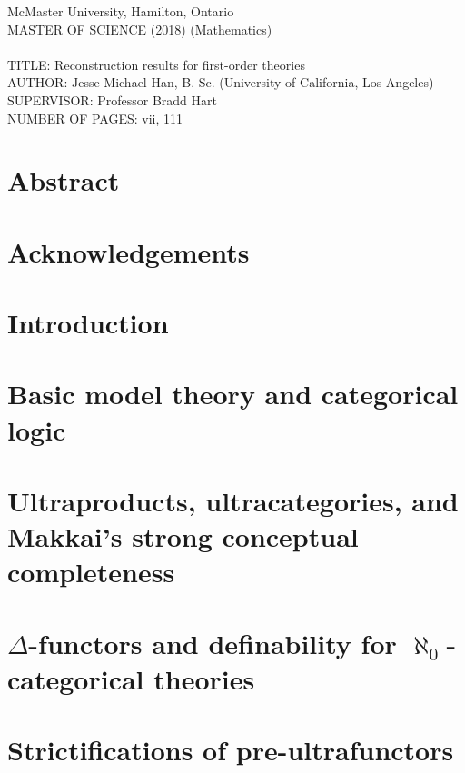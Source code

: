 \documentclass[12pt]{report}
\begin{document}
{\noindent McMaster University, Hamilton, Ontario\\MASTER OF SCIENCE (2018) (Mathematics)\\
\text{  }\\
TITLE: Reconstruction results for first-order theories\\
AUTHOR: Jesse Michael Han, B. Sc. (University of California, Los Angeles)\\
SUPERVISOR: Professor Bradd Hart\\
NUMBER OF PAGES: vii, 111
\setcounter{page}{2}

\chapter*{Abstract}



\chapter*{Acknowledgements}


\tableofcontents

\newpage
{}\setcounter{page}{1}
\chapter{Introduction}


\chapter{Basic model theory and categorical logic}


\chapter{Ultraproducts, ultracategories, and Makkai's strong conceptual completeness}


\chapter{$\Delta$-functors and definability for $\aleph_0$-categorical theories}


\chapter{Strictifications of pre-ultrafunctors}


}
\end{document}
